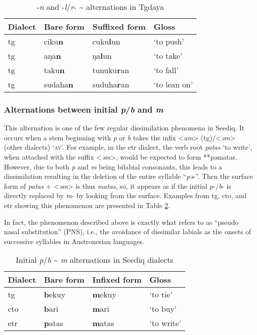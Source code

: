 \begin{table}[!htbp]
\centering
\caption{-\textit{n} and -\textit{l}/\textit{r}- \~{} alternations in Tgdaya}
\label{tab:lrn_alt}
\begin{tabular}{llll}
\hline
Dialect  & Bare form & Suffixed form & Gloss        \\ \hline
\acl{tg} & ciku\textbf{n}     & cuku\textbf{l}un      & `to push'    \\
\acl{tg} & aŋa\textbf{n}      & ŋa\textbf{l}un        & `to take'    \\
\acl{tg} & taku\textbf{n}     & tunuku\textbf{r}an    & `to fall'    \\
\acl{tg} & sudaha\textbf{n}   & suduha\textbf{r}an    & `to lean on' \\\hline
\end{tabular}
\end{table}

\subsubsection{Alternations between initial \textit{p}/\textit{b} and \textit{m}} \label{sec:pbm_alter}

This alternation is one of the few regular dissimilation phenomena in Seediq. It occurs when a stem beginning with \textit{p} or \textit{b} takes the infix <\textit{um}> (\acs{tg})/<\textit{əm}> (other dialects) `\textsc{av}'. For example, in the \acl{etr} dialect, the verb root \textit{patas} `to write', when attached with the suffix <\textit{əm}>, would be expected to form **pəmatas. However, due to both \textit{p} and \textit{m} being bilabial consonants, this leads to a dissimilation resulting in the deletion of the entire syllable ``\textit{pə}-''. Then the surface form of \textit{patas} + <\textit{əm}> is thus \textit{matas}, so, it appears as if the initial \textit{p}-/\textit{b}- is directly replaced by \textit{m}- by looking from the surface. Examples from \acl{tg}, \acl{cto}, and \acl{etr} showing this phenomenon are presented in Table \ref{tab:bpm_alt}.

In fact, the phenomenon described above is exactly what \textcite{blust1998thao} refers to as ``pseudo nasal substitution'' (PNS), i.e., the avoidance of dissimilar labials as the onsets of successive syllables in Austronesian languages. 

\begin{table}[!htbp]
\centering
\caption{Initial \textit{p}/\textit{b} \~{} \textit{m} alternations in Seediq dialects}
\label{tab:bpm_alt}
\begin{tabular}{llll}
\hline
Dialect   & Bare form & Infixed form & Gloss      \\ \hline
\acl{tg}  & \textbf{b}ekuy     & \textbf{m}ekuy        & `to tie'   \\ 
\acl{cto} & \textbf{b}ari      & \textbf{m}ari         & `to buy'   \\
\acl{etr} & \textbf{p}atas     & \textbf{m}atas        & `to write' \\ \hline
\end{tabular}
\end{table}


